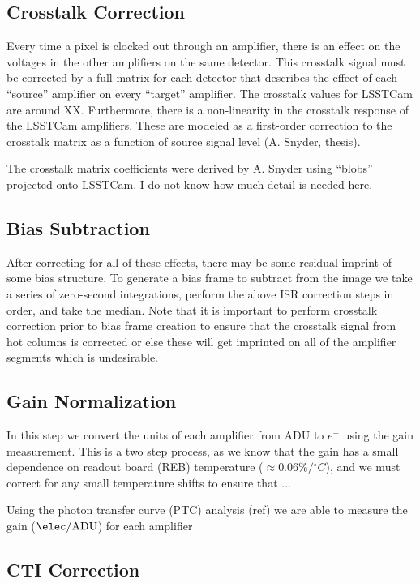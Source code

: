 \documentclass[SE,authoryear,lsstdraft,toc]{lsstdoc}
\newcommand{\etron}{e^{-}}
\begin{document}
\subsection{Crosstalk Correction}

Every time a pixel is clocked out through an amplifier, there is an effect on
the voltages in the other amplifiers on the same detector.  This crosstalk
signal must be corrected by a full matrix for each detector that describes the
effect of each ``source'' amplifier on every ``target'' amplifier.  The
crosstalk values for LSSTCam are around XX.  Furthermore, there is a
non-linearity in the crosstalk response of the LSSTCam amplifiers.  These are
modeled as a first-order correction to the crosstalk matrix as a function of
source signal level (A. Snyder, thesis).

The crosstalk matrix coefficients were derived by A. Snyder using ``blobs''
projected onto LSSTCam.  I do not know how much detail is needed here.

\subsection{Bias Subtraction}

After correcting for all of these effects, there may be some residual imprint
of some bias structure.  To generate a bias frame to subtract from the image we
take a series of zero-second integrations, perform the above ISR correction
steps in order, and take the median.  Note that it is important to perform
crosstalk correction prior to bias frame creation to ensure that the crosstalk
signal from hot columns is corrected or else these will get imprinted on all of
the amplifier segments which is undesirable.

\subsection{Gain Normalization}

In this step we convert the units of each amplifier from ADU to $\etron$ using
the gain measurement.  This is a two step process, as we know that the gain has
a small dependence on readout board (REB) temperature ($\approx
0.06\%/{^\circ}C$), and we must correct for any small temperature shifts to
ensure that ...

Using the photon transfer curve (PTC) analysis (ref) we are able to measure the
gain ($\elec/\mathrm{ADU}$) for each amplifier

\subsection{CTI Correction}
\end{document}
